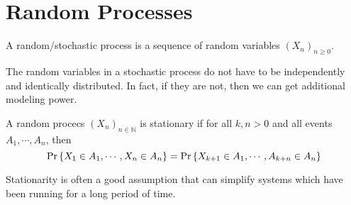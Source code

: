 \section{Random Processes}
\begin{definition}
	A random/stochastic process is a sequence of random variables $(X_n)_{n\geq 0}$.
	\label{defn:random-process}
\end{definition}
The random variables in a stochastic process do not have to be independently and identically distributed.
In fact, if they are not, then we can get additional modeling power.
\begin{definition}
	A random procecs $(X_n)_{n\in\mathbb{N}}$ is stationary if for all $k, n > 0$ and all events $A_1,\cdots,A_n$, then \[
		\text{Pr}\left\{X_1\in A_1,\cdots,X_n\in A_n\right\} = \text{Pr}\left\{X_{k+1}\in A_1,\cdots,A_{k+n}\in A_n\right\}
	\]
	\label{defn:stationarity}
\end{definition}
Stationarity is often a good assumption that can simplify systems which have been running for a long period of time.

